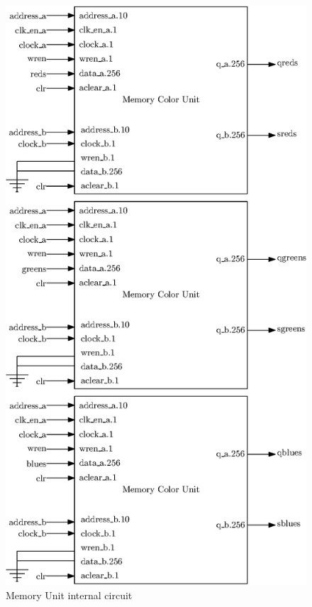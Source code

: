 \begin{figure}[H]
    \centering
    \includegraphics[scale=1.0]{Chapter4-GPU_CLKU/res/memory_unit_in}
    \caption{Memory Unit internal circuit}
    \label{fig:gpu/memory_unit_in}
\end{figure}

